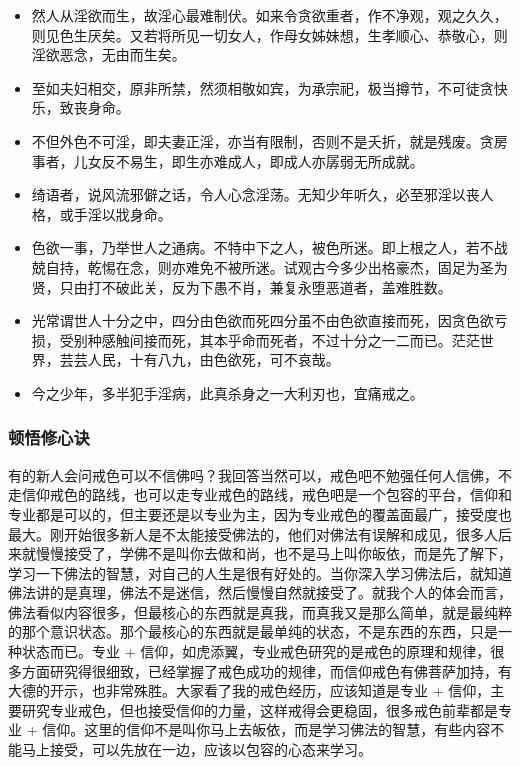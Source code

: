 \begin{itemize}
    \item 然人从淫欲而生，故淫心最难制伏。如来令贪欲重者，作不净观，观之久久，则见色生厌矣。又若将所见一切女人，作母女姊妹想，生孝顺心、恭敬心，则淫欲恶念，无由而生矣。
    \item 至如夫妇相交，原非所禁，然须相敬如宾，为承宗祀，极当撙节，不可徒贪快乐，致丧身命。
    \item 不但外色不可淫，即夫妻正淫，亦当有限制，否则不是夭折，就是残废。贪房事者，儿女反不易生，即生亦难成人，即成人亦孱弱无所成就。
    \item 绮语者，说风流邪僻之话，令人心念淫荡。无知少年听久，必至邪淫以丧人格，或手淫以戕身命。
    \item 色欲一事，乃举世人之通病。不特中下之人，被色所迷。即上根之人，若不战兢自持，乾惕在念，则亦难免不被所迷。试观古今多少出格豪杰，固足为圣为贤，只由打不破此关，反为下愚不肖，兼复永堕恶道者，盖难胜数。
    \item 光常谓世人十分之中，四分由色欲而死四分虽不由色欲直接而死，因贪色欲亏损，受别种感触间接而死，其本乎命而死者，不过十分之一二而已。茫茫世界，芸芸人民，十有八九，由色欲死，可不哀哉。
    \item 今之少年，多半犯手淫病，此真杀身之一大利刃也，宜痛戒之。
\end{itemize}

\subsubsection{顿悟修心诀}

有的新人会问戒色可以不信佛吗？我回答当然可以，戒色吧不勉强任何人信佛，不走信仰戒色的路线，也可以走专业戒色的路线，戒色吧是一个包容的平台，信仰和专业都是可以的，但主要还是以专业为主，因为专业戒色的覆盖面最广，接受度也最大。刚开始很多新人是不太能接受佛法的，他们对佛法有误解和成见，很多人后来就慢慢接受了，学佛不是叫你去做和尚，也不是马上叫你皈依，而是先了解下，学习一下佛法的智慧，对自己的人生是很有好处的。当你深入学习佛法后，就知道佛法讲的是真理，佛法不是迷信，然后慢慢自然就接受了。就我个人的体会而言，佛法看似内容很多，但最核心的东西就是真我，而真我又是那么简单，就是最纯粹的那个意识状态。那个最核心的东西就是最单纯的状态，不是东西的东西，只是一种状态而已。专业 + 信仰，如虎添翼，专业戒色研究的是戒色的原理和规律，很多方面研究得很细致，已经掌握了戒色成功的规律，而信仰戒色有佛菩萨加持，有大德的开示，也非常殊胜。大家看了我的戒色经历，应该知道是专业 + 信仰，主要研究专业戒色，但也接受信仰的力量，这样戒得会更稳固，很多戒色前辈都是专业 + 信仰。这里的信仰不是叫你马上去皈依，而是学习佛法的智慧，有些内容不能马上接受，可以先放在一边，应该以包容的心态来学习。

